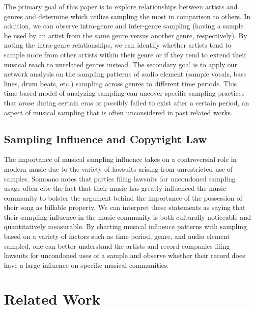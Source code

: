 \documentclass[pageno]{jpaper}
\begin{document}
The primary goal of this paper is to explore relationships between artists and genres and determine which utilize sampling the most in comparison to others. In addition, we can observe intra-genre and inter-genre sampling (having a sample be used by an artist from the same genre versus another genre, respectively). By noting the intra-genre relationships, we can identify whether artists tend to sample more from other artists within their genre or if they tend to extend their musical reach to unrelated genres instead. 
The secondary goal is to apply our network analysis on the sampling patterns of audio element (sample vocals, bass lines, drum beats, etc.) sampling across genres to different time periods. This time-based model of analyzing sampling can uncover specific sampling practices that arose during certain eras or possibly failed to exist after a certain period, an aspect of musical sampling that is often unconsidered in past related works.
\subsection{Sampling Influence and Copyright Law}
The importance of musical sampling influence takes on a controversial role in modern music due to the variety of lawsuits arising from unrestricted use of samples. Somoano notes that  parties filing lawsuits for uncondoned sampling usage often cite the fact that their music has greatly influenced the music community to bolster the argument behind the importance of the possession of their song as billable property. \cite{Somoano} We can interpret these statements as saying that their sampling influence in the music community is both culturally noticeable and quantitatively measurable. By charting musical influence patterns with sampling based on a variety of factors such as time period, genre, and audio element sampled, one can better understand the artists and record companies filing lawsuits for uncondoned uses of a sample and observe whether their record does have a large influence on specific musical communities. 
\section{Related Work}
\end{document}
